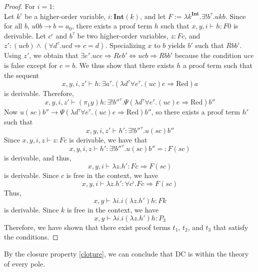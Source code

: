 \documentclass[a4paper,12pt]{article}
\theoremstyle{rmqstyle}
\renewcommand{\int}{\mathbf{Int}}
\renewcommand{\implies}{\Rightarrow}
\renewcommand{\iff}{\Leftrightarrow}
\newcommand{\DC}{\mathrm{DC}}
\begin{document}
\begin{proof}
For $i = 1$:\\
Let $k^\iota$ be a higher-order variable, $i : \int(k)$, and let $F := \lambda k^\int. \exists ! b^\tau. ukb$. Since for all $b$, $u 0 b \longrightarrow b = a_0$, there exists a proof term $h$ such that $x,y,i \vdash h : F0$ is derivable. Let $c^\iota$ and $b^\tau$ be two higher-order variables, $z : Fc$, and $z' : (ucb) \land (\forall d^\tau. ucd \implies c =d)$. Specializing $x$ to $b$ yields $b'$ such that $Rbb'$. Using $z'$, we obtain that $\exists e^\tau. uce \implies Reb' \iff ucb \implies Rbb'$ because the condition $uce$ is false except for $e = b$. We thus show that there exists $h$ a proof term such that the sequent
$$ x,y,i,z' \vdash h : \exists a^\tau. (\lambda d^\tau \forall e^\tau. (uc) e \implies \text{Red}) a $$
is derivable. Therefore,
$$ x,y,i,z' \vdash (\pi_1y) h : \exists ! b''^\tau. \Psi (\lambda d^\tau \forall e^\tau. (uc) e \implies \text{Red}) b'' $$
Now $u (sc) b'' \longrightarrow \Psi (\lambda d^\tau \forall e^\tau. (uc) e \implies \text{Red}) b''$, so there exists a proof term $h'$ such that
$$ x,y,i,z' \vdash h' : \exists ! b''^\tau. u(sc) b'' $$
Since $x,y,i,z \vdash z : Fc$ is derivable, we have that
$$ x,y,i,z \vdash h' : \exists ! b''^\tau. u(sc) b'' =: F(sc) $$
is derivable, and thus,
$$ x,y,i \vdash \lambda z. h' : Fc \implies F(sc) $$
is derivable. Since $c$ is free in the context, we have
$$ x,y, i \vdash  \lambda z. h' : \forall c^\iota. Fc \implies F(sc) $$
Thus,
$$ x,y \vdash \lambda i. i (\lambda z. h') h : Fk $$
is derivable. Since $k$ is free in the context, we have
$$ x,y \vdash \lambda i. i (\lambda z. h') h : P_3 $$
Therefore, we have shown that there exist proof terms $t_1$, $t_2$, and $t_3$ that satisfy the conditions. 
\end{proof}

By the closure property \ref{cloture}, we can conclude that $\DC$ is within the theory of every pole.

\clearpage




\end{document}
